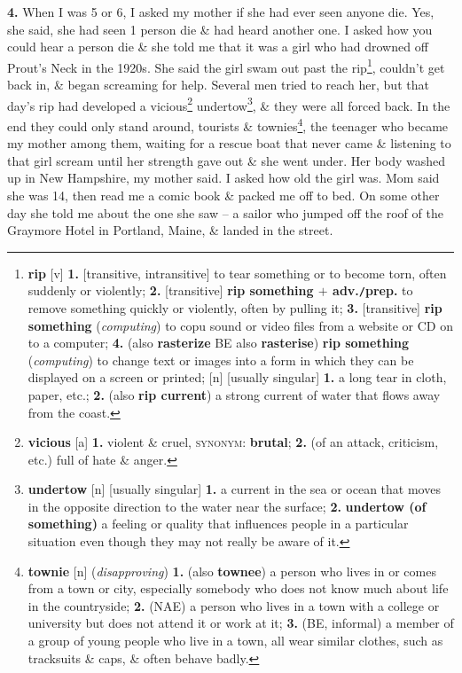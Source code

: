 \documentclass[oneside]{book}
\numberwithin{equation}{section}
\begin{document}
\textbf{4.} When I was 5 or 6, I asked my mother if she had ever seen anyone die. Yes, she said, she had seen 1 person die \& had heard another one. I asked how you could hear a person die \& she told me that it was a girl who had drowned off Prout's Neck in the 1920s. She said the girl swam out past the rip\footnote{\textbf{rip} [v] \textbf{1.} [transitive, intransitive] to tear something or to become torn, often suddenly or violently; \textbf{2.} [transitive] \textbf{rip something $+$ adv.\texttt{/}prep.} to remove something quickly or violently, often by pulling it; \textbf{3.} [transitive] \textbf{rip something} (\textit{computing}) to copu sound or video files from a website or CD on to a computer; \textbf{4.} (also \textbf{rasterize} BE also \textbf{rasterise}) \textbf{rip something} (\textit{computing}) to change text or images into a form in which they can be displayed on a screen or printed; [n] [usually singular] \textbf{1.} a long tear in cloth, paper, etc.; \textbf{2.} (also \textbf{rip current}) a strong current of water that flows away from the coast.}, couldn't get back in, \& began screaming for help. Several men tried to reach her, but that day's rip had developed a vicious\footnote{\textbf{vicious} [a] \textbf{1.} violent \& cruel, \textsc{synonym}: \textbf{brutal}; \textbf{2.} (of an attack, criticism, etc.) full of hate \& anger.} undertow\footnote{\textbf{undertow} [n] [usually singular] \textbf{1.} a current in the sea or ocean that moves in the opposite direction to the water near the surface; \textbf{2.} \textbf{undertow (of something)} a feeling or quality that influences people in a particular situation even though they may not really be aware of it.}, \& they were all forced back. In the end they could only stand around, tourists \& townies\footnote{\textbf{townie} [n] (\textit{disapproving}) \textbf{1.} (also \textbf{townee}) a person who lives in or comes from a town or city, especially somebody who does not know much about life in the countryside; \textbf{2.} (NAE) a person who lives in a town with a college or university but does not attend it or work at it; \textbf{3.} (BE, informal) a member of a group of young people who live in a town, all wear similar clothes, such as tracksuits \& caps, \& often behave badly.}, the teenager who became my mother among them, waiting for a rescue boat that never came \& listening to that girl scream until her strength gave out \& she went under. Her body washed up in New Hampshire, my mother said. I asked how old the girl was. Mom said she was 14, then read me a comic book \& packed me off to bed. On some other day she told me about the one she saw -- a sailor who jumped off the roof of the Graymore Hotel in Portland, Maine, \& landed in the street.
\end{document}

